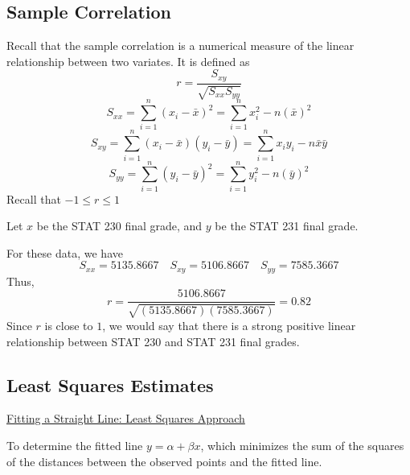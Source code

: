 \subsection{Sample Correlation}
Recall that the sample correlation is a numerical measure of the linear relationship between two variates.
It is defined as
\[r=\frac{S_{x y}}{\sqrt{S_{x x} S_{y y}}}\]
\[S_{x x}=\sum_{i=1}^{n}\left(x_{i}-\bar{x}\right)^{2}=\sum_{i=1}^{n} x_{i}^{2}-n(\bar{x})^{2}\]
\[S_{x y}=\sum_{i=1}^{n}\left(x_{i}-\bar{x}\right)\left(y_{i}-\bar{y}\right)=\sum_{i=1}^{n} x_{i} y_{i}-n \bar{x} \bar{y}\]
\[S_{y y}=\sum_{i=1}^{n}\left(y_{i}-\bar{y}\right)^{2}=\sum_{i=1}^{n} y_{i}^{2}-n(\bar{y})^{2}\]
Recall that $ -1\leqslant r\leqslant 1 $
\begin{exbox}
    \begin{example}
        Let $ x $ be the STAT 230 final grade, and $ y $ be the STAT 231 final grade.

        For these data, we have
        \[S_{x x}=5135.8667 \quad S_{x y}=5106.8667 \quad S_{y y}=7585.3667\]
        Thus,
        \[r=\frac{5106.8667}{\sqrt{(5135.8667)(7585.3667)}}=0.82\]
        Since $ r $ is close to $ 1 $, we would say that there is a strong positive linear
        relationship between STAT 230 and STAT 231 final grades.
    \end{example}
\end{exbox}

\subsection{Least Squares Estimates}
\underline{Fitting a Straight Line: Least Squares Approach}

To determine the fitted line $ y=\alpha+\beta x $, which minimizes the sum of the squares
of the distances between the observed points and the fitted line.

